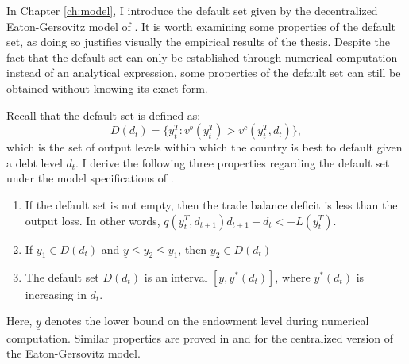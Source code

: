 In Chapter \ref{ch:model}, I introduce the default set given by the decentralized Eaton-Gersovitz model of \citet{Na-18}.
It is worth examining some properties of the default set, as doing so justifies visually the empirical results of the thesis.
Despite the fact that the default set can only be established through numerical computation instead of an analytical expression, some properties of the default set can still be obtained without knowing its exact form.

\newcommand{\yT}{y^T_{t}}
\newcommand{\yTpr}{y^T_{t+1}}
\newcommand{\dpr}{d_{t+1}}
Recall that the default set is defined as:
\begin{equation*}
    D(d_t) = \{\yT : v^b(\yT) > v^c(\yT, d_t)\},
\end{equation*}
which is the set of output levels within which the country is best to default given a debt level $d_t$.
I derive the following three properties regarding the default set under the model specifications of \citet{Na-18}.
\begin{enumerate}
    \item If the default set is not empty, then the trade balance deficit  is less than the output loss. In other words, $q(\yT, \dpr)\dpr - d_t < -L(\yT)$.
    \item If $y_1 \in D(d_t)$ and $\underline{y}\le y_2 \le y_1$, then $y_2 \in D(d_t)$
    \item The default set $D(d_t)$ is an interval $[\underline{y}, y^*(d_t)]$, where $y^*(d_t)$ is increasing in $d_t$.
\end{enumerate}
Here, $\underline{y}$ denotes the lower bound on the endowment level during numerical computation.
Similar properties are proved in \citet*{Arellano-08} and \citet*{Uribe-Schmitt-Grohe-textbook} for the centralized version of the Eaton-Gersovitz model.

